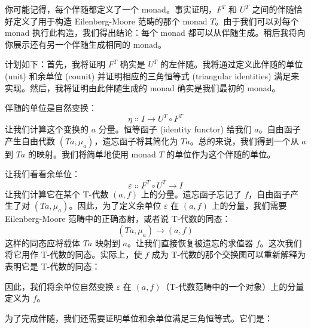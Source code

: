 你可能记得，每个伴随都定义了一个 monad。事实证明，$F^T$ 和 $U^T$ 之间的伴随恰好定义了用于构造 Eilenberg-Moore 范畴的那个 monad $T$。由于我们可以对每个 monad 执行此构造，我们得出结论：每个 monad 都可以从伴随生成。稍后我将向你展示还有另一个伴随生成相同的 monad。

计划如下：首先，我将证明 $F^T$ 确实是 $U^T$ 的左伴随。我将通过定义此伴随的单位 (unit) 和余单位 (counit) 并证明相应的三角恒等式 (triangular identities) 满足来实现。然后，我将证明由此伴随生成的 monad 确实是我们最初的 monad。

伴随的单位是自然变换：
\[\eta \Colon I \to U^T \circ F^T\]
让我们计算这个变换的 $a$ 分量。恒等函子 (identity functor) 给我们 $a$。自由函子产生自由代数 $(T a, \mu_a)$，遗忘函子将其简化为 $T a$。总的来说，我们得到一个从 $a$ 到 $T a$ 的映射。我们将简单地使用 monad $T$ 的单位作为这个伴随的单位。

让我们看看余单位：
\[\varepsilon \Colon F^T \circ U^T \to I\]
让我们计算它在某个 T-代数 $(a, f)$ 上的分量。遗忘函子忘记了 $f$，自由函子产生了对 $(T a, \mu_a)$。因此，为了定义余单位 $\varepsilon$ 在 $(a, f)$ 上的分量，我们需要 Eilenberg-Moore 范畴中的正确态射，或者说 T-代数的同态：
\[(T a, \mu_a) \to (a, f)\]
这样的同态应将载体 $T a$ 映射到 $a$。让我们直接恢复被遗忘的求值器 $f$。这次我们将它用作 T-代数的同态。实际上，使 $f$ 成为 T-代数的那个交换图可以重新解释为表明它是 T-代数的同态：

\begin{figure}[H]
  \centering
\end{figure}

\noindent
因此，我们将余单位自然变换 $\varepsilon$ 在 $(a, f)$（T-代数范畴中的一个对象）上的分量定义为 $f$。

为了完成伴随，我们还需要证明单位和余单位满足三角恒等式。它们是：

\begin{figure}[H]
  \centering
  \begin{subfigure}
    \centering
  \end{subfigure}%
  \hspace{1cm}
  \begin{subfigure}
    \centering
  \end{subfigure}
\end{figure}

